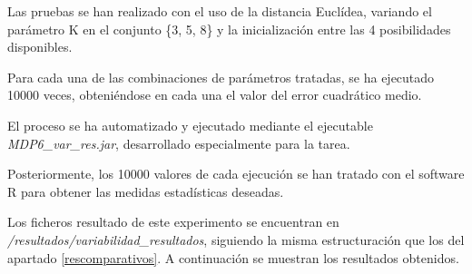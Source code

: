 \documentclass[a4paper]{report}
\begin{document}
	Las pruebas se han realizado con el uso de la distancia Euclídea, variando el parámetro K en el conjunto \{3, 5, 8\} y la inicialización entre las 4 posibilidades disponibles.
	
	Para cada una de las combinaciones de parámetros tratadas,  se ha ejecutado 10000 veces, obteniéndose en cada una el valor del error cuadrático medio.
	
	El proceso se ha automatizado y ejecutado mediante el ejecutable \textit{MDP6\_var\_res.jar}, desarrollado especialmente para la tarea.
	
	Posteriormente, los 10000 valores de cada ejecución se han tratado con el software R para obtener  las medidas estadísticas deseadas.
	
	Los ficheros resultado de este experimento se encuentran en \textit{/resultados/variabilidad\_resultados}, siguiendo la misma estructuración que los del apartado \ref{rescomparativos}. A continuación se muestran los resultados obtenidos.
	
\end{document}
